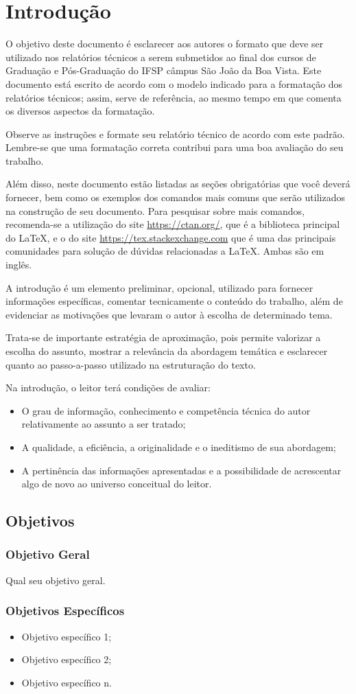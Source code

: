 \chapter{Introdução}
\label{cap:01}

O objetivo deste documento é esclarecer aos autores o formato que deve ser utilizado nos relatórios técnicos a serem submetidos ao final dos cursos de Graduação e Pós-Graduação do IFSP câmpus São João da Boa Vista. Este documento está escrito de acordo com o modelo indicado para a formatação dos relatórios técnicos; assim, serve de referência, ao mesmo tempo em que comenta os diversos aspectos da formatação.

Observe as instruções e formate seu relatório técnico de acordo com este padrão. Lembre-se que uma formatação correta contribui para uma boa avaliação do seu trabalho.

Além disso, neste documento estão listadas as seções obrigatórias que você deverá fornecer, bem como os exemplos dos comandos mais comuns que serão utilizados na construção de seu documento. Para pesquisar sobre mais comandos, recomenda-se a utilização do site \url{https://ctan.org/}, que é a biblioteca principal do \LaTeX, e o do site \url{https://tex.stackexchange.com} que é uma das principais comunidades para solução de dúvidas relacionadas a \LaTeX. Ambas são em inglês.

A introdução é um elemento preliminar, opcional, utilizado para fornecer informações específicas, comentar tecnicamente o conteúdo do trabalho, além de evidenciar as motivações que levaram o autor à escolha de determinado tema.

Trata-se de importante estratégia de aproximação, pois permite valorizar a escolha do assunto, mostrar a relevância da abordagem temática e esclarecer quanto ao passo-a-passo utilizado na estruturação do texto.

Na introdução, o leitor terá condições de avaliar:

\begin{itemize}
	\item O grau de informação, conhecimento e competência técnica do autor relativamente ao assunto a ser tratado;
	\item A qualidade, a eficiência, a originalidade e o ineditismo de sua abordagem;
	\item A pertinência das informações apresentadas e a possibilidade de acrescentar algo de novo ao universo conceitual do leitor.
\end{itemize}


\section{Objetivos}

\subsection{Objetivo Geral}

Qual seu objetivo geral.

\subsection{Objetivos Específicos}
\begin{itemize}
	\item Objetivo específico 1;
	\item Objetivo específico 2;
	\item Objetivo específico n.
\end{itemize}